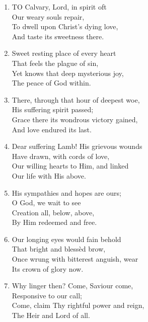 \begin{enumerate}
    \item TO Calvary, Lord, in spirit oft \\
            Our weary souls repair, \\
        To dwell upon Christ's dying love, \\
            And taste its sweetness there.

    \item Sweet resting place of every heart \\
            That feels the plague of sin, \\
        Yet knows that deep mysterious joy, \\
            The peace of God within.

    \item There, through that hour of deepest woe, \\
            His suffering spirit passed; \\
        Grace there its wondrous victory gained, \\
            And love endured its last.

    \item Dear suffering Lamb! His grievous wounds \\
            Have drawn, with cords of love, \\
        Our willing hearts to Him, and linked \\
            Our life with His above.

    \item His sympathies and hopes are ours; \\
            O God, we wait to see \\
        Creation all, below, above, \\
            By Him redeemed and free.

    \item Our longing eyes would fain behold \\
            That bright and bless\`ed brow, \\
        Once wrung with bitterest anguish, wear \\
            Its crown of glory now.

    \item Why linger then? Come, Saviour come, \\
            Responsive to our call; \\
        Come, claim Thy rightful power and reign, \\
            The Heir and Lord of all.

\end{enumerate}

